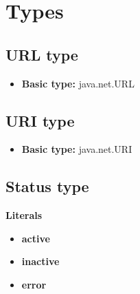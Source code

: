 \documentclass{article}
\begin{document}
\section{Types}
\subsection{URL type}

\begin{itemize}
\item \textbf{Basic type:} java.net.URL
\end{itemize}
\subsection{URI type}

\begin{itemize}
\item \textbf{Basic type:} java.net.URI
\end{itemize}
\subsection{Status type}

\textbf{Literals}
\begin{itemize}
\item \textbf{active} 
\end{itemize}
\begin{itemize}
\item \textbf{inactive} 
\end{itemize}
\begin{itemize}
\item \textbf{error} 
\end{itemize}
\end{document}
